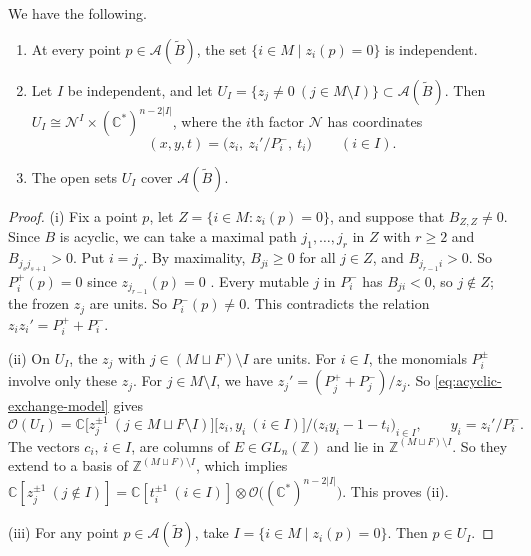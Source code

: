 \documentclass[11pt,a4paper]{article}
\newcommand{\cA}{\mathcal A}\newcommand{\sA}{\mathcal A}
\newcommand{\cN}{\mathcal N}\newcommand{\cO}{\mathcal O}
\newcommand{\bC}{\mathbb C}\newcommand{\bR}{\mathbb R}\newcommand{\bZ}{\mathbb Z}
\begin{document}
\begin{lemma}

\label{lem:acyclic-node-charts}
We have the following.
\begin{enumerate}[label=\textup{(\roman*)}]
\item At every point \(p\in\cA(\widetilde B)\), the set $\{i\in M \mid z_i(p)=0\}$ is independent.
\item Let $I$ be independent, and let $U_I=\{z_j\ne0\ (j\in M\setminus I)\}\subset\cA(\widetilde B)$.
Then $U_I\cong\cN^{I}\times(\bC^*)^{n-2|I|}$, where the $i$th factor $\cN$ has coordinates
\[
 (x,y,t)=\bigl(z_i,\ z_i'/P_i^-,\ t_i\bigr)\qquad(i\in I).
\]
\item The open sets $U_I$ cover $\cA(\widetilde B)$.
\end{enumerate}
\end{lemma}

\begin{proof}
(i) Fix a point \(p\), let $Z=\{i\in M:z_i(p)=0\}$, and suppose that $B_{Z,Z}\ne0$.
Since \(B\) is acyclic, we can take a maximal path $j_1,\dots,j_r$ in $Z$ with $r\ge2$ and $B_{j_sj_{s+1}}>0$.
Put \(i = j_r\). 
By maximality,  $B_{ji}\ge0$ for all $j\in Z$, and $B_{j_{r-1}i}>0$.
So $P_i^+(p)=0$ since \(z_{j_{r-1}}(p) = 0\) .
Every mutable $j$ in $P_i^-$ has $B_{ji}<0$, so $j\notin Z$; the frozen $z_j$ are units.
So $P_i^-(p)\ne0$. This contradicts the relation $z_iz_i'=P_i^+ + P_i^-$.

(ii) On $U_I$, the $z_j$ with $j\in(M\sqcup F)\setminus I$ are units. 
For $i\in I$, the monomials $P_i^\pm$ involve only these $z_j$.
For $j\in M\setminus I$, we have $z_j'=(P_j^++P_j^-)/z_j$.
So \eqref{eq:acyclic-exchange-model} gives
\[
 \cO(U_I)=\bC\bigl[z_j^{\pm1}\ (j\in M \sqcup F \setminus I)\bigr]\bigl[z_i,y_i\ (i\in I)\bigr]\big/\bigl(z_iy_i-1-t_i\bigr)_{i\in I},
 \qquad y_i=z_i'/P_i^-.
\]
The vectors $c_i$, $i\in I$, are columns of $E\in GL_{n}(\bZ)$ and lie in $\bZ^{(M\sqcup F)\setminus I}$.
So they extend to a basis of $\bZ^{(M\sqcup F)\setminus I}$, which implies $\bC[z_j^{\pm1}\ (j\notin I)]=\bC[t_i^{\pm1}\ (i\in I)]\otimes\cO\bigl((\bC^*)^{n-2|I|}\bigr)$. This proves (ii). 


(iii) For any point \(p\in \cA(\widetilde B)\), take $I = \{ i \in M \mid z_i(p) = 0\}$. Then \( p \in U_I\). 
\end{proof}
\end{document}
